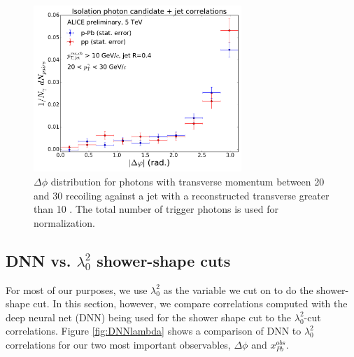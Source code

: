 



\begin{figure}
\centering
\includegraphics[width=0.7\textwidth]{GammaJet/Isolation_photon_candidate_jet_correlations.pdf}
\caption{$\Delta \phi$ distribution for photons with transverse momentum between 20 and 30 \GeVc recoiling against a jet with a reconstructed transverse greater than 10 \GeVc. The total number of trigger photons is used for normalization.}
\label{fig:isoGammaCandiJetCorr}
\end{figure}

\FloatBarrier
\subsection{DNN vs. $\lambda_0^2$ shower-shape cuts}
For most of our purposes, we use $\lambda_0^2$ as the variable we cut on to do the shower-shape cut. In this section, however, we compare correlations computed with the deep neural net (DNN) being used for the shower shape cut to the $\lambda_0^2$-cut correlations. Figure \ref{fig:DNNlambda} shows a comparison of DNN to $\lambda_0^2$ correlations for our two most important observables, $\Delta \phi$ and $x^{obs}_{Pb}$.

